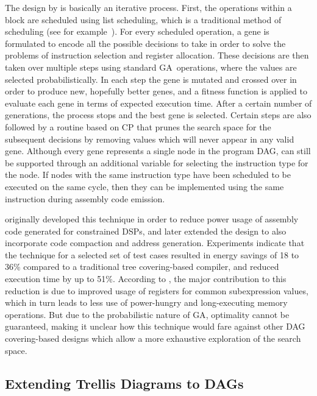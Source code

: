 The design by \citeauthor{Lorenz2001} is basically an iterative process.
%
First,
the operations within a \gls{block} are scheduled using \gls{list scheduling},
which is a traditional method of scheduling (see for
example~\cite{Rau1993}).
%
For every scheduled operation, a \gls{gene} is
formulated to encode all the possible decisions to take in order to solve the
problems of \gls{instruction selection} and \gls{register allocation}.
%
These
decisions are then taken over multiple steps using standard \gls{GA}~operations,
where the values are selected probabilistically.
%
In each step the \gls{gene} is
mutated and crossed over in order to produce new, hopefully better \glspl{gene},
and a \gls{fitness function} is applied to evaluate each \gls{gene} in terms of
expected execution time.
%
After a certain number of generations, the process
stops and the best \gls{gene} is selected.
%
Certain steps are also followed by a
routine based on \glsdesc{CP} that prunes the search space for the subsequent
decisions by removing values which will never appear in any valid
\gls{gene}.
%
Although every \gls{gene} represents a single \gls{node} in the
\gls{program DAG}, \tcomplexPatterns can still be supported through an
additional variable for selecting the \gls{instruction} type for the
\gls{node}.
%
If \glspl{node} with the same \gls{instruction} type have been
scheduled to be executed on the same cycle, then they can be implemented using
the same \gls{instruction} during \gls{assembly code} emission.

\citeauthor{Lorenz2001} originally developed this technique in order to reduce
power usage of \gls{assembly code} generated for constrained \glspl{DSP}, and
later extended the design to also incorporate \gls{code compaction} and
\gls{address generation}.
%
Experiments indicate that the technique for a selected
set of test cases resulted in energy savings of 18 to 36\% compared to a
traditional \gls{tree covering}-based \gls{compiler}, and reduced execution time
by up to 51\%.
%
According to \citeauthor{Lorenz2001}, the major contribution to
this reduction is due to improved usage of \glspl{register} for common
subexpression values, which in turn leads to less use of power-hungry and
long-executing memory operations.
%
But due to the probabilistic nature of
\gls{GA}, optimality cannot be guaranteed, making it unclear how this technique
would fare against other \gls{DAG covering}-based designs which allow a more
exhaustive exploration of the search space.


\subsection{Extending Trellis Diagrams to DAGs}

